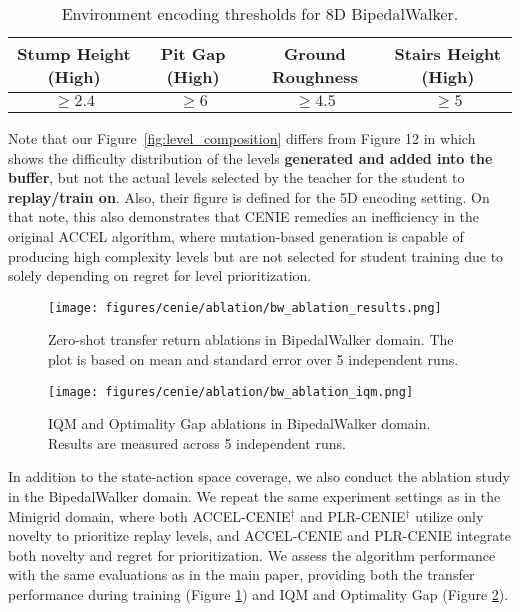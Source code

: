 \begin{table}[h]
\caption{Environment encoding thresholds for 8D BipedalWalker.}
\label{tab:difficulty_thresholds_bw}
\centering
\begin{tabular}{cccc}
\toprule
\textbf{Stump Height (High)} & \textbf{Pit Gap (High)} & \textbf{Ground Roughness} & \textbf{Stairs Height (High)} \\ 
\midrule
$\geq 2.4$ & $\geq 6$ & $\geq 4.5$ & $\geq 5$ \\ 
\bottomrule
\end{tabular}
\end{table}

Note that our Figure~\ref{fig:level_composition} differs from Figure 12 in \citet{parker2022evolving} which shows the difficulty distribution of the levels \textbf{generated and added into the buffer}, but not the actual levels selected by the teacher for the student to \textbf{replay/train on}. Also, their figure is defined for the 5D encoding setting. On that note, this also demonstrates that CENIE remedies an inefficiency in the original ACCEL algorithm, where mutation-based generation is capable of producing high complexity levels but are not selected for student training due to solely depending on regret for level prioritization. 

\begin{figure}[h]
  \centering
  \texttt{[image: figures/cenie/ablation/bw\_ablation\_results.png]}
  \caption{Zero-shot transfer return ablations in BipedalWalker domain. The plot is based on mean and standard error over 5 independent runs.}
  \label{fig:bw_ablation_results}
\end{figure}

\begin{figure}[h]
  \centering
  \texttt{[image: figures/cenie/ablation/bw\_ablation\_iqm.png]}
  \caption{IQM and Optimality Gap ablations in BipedalWalker domain. Results are measured across 5 independent runs.}
  \label{fig:bw_ablation_iqm}
\end{figure}

In addition to the state-action space coverage, we also conduct the ablation study in the BipedalWalker domain. We repeat the same experiment settings as in the Minigrid domain, where both ACCEL-CENIE$^\dag$ and PLR-CENIE$^\dag$ utilize only novelty to prioritize replay levels, and ACCEL-CENIE and PLR-CENIE integrate both novelty and regret for prioritization. We assess the algorithm performance with the same evaluations as in the main paper, providing both the transfer performance during training (Figure \ref{fig:bw_ablation_results}) and IQM and Optimality Gap (Figure \ref{fig:bw_ablation_iqm}). 

